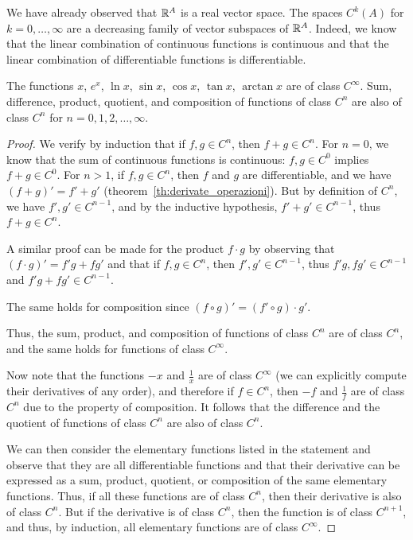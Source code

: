 We have already observed that ${\mathbb R}^A$ is a real vector space.
The spaces $C^k(A)$ for $k=0, \dots, \infty$ are a decreasing family of vector
subspaces of ${\mathbb R}^A$.
Indeed, we know that the linear combination of continuous functions is
continuous and that the linear combination of differentiable functions is
differentiable.

\begin{theorem}
The functions $x$, $e^x$, $\ln x$, $\sin x$, $\cos x$, $\tan x$, $\arctan x$ are
of class $C^\infty$.
Sum, difference, product, quotient, and composition of functions of class $C^n$
are also of class $C^n$ for $n=0,1,2,\dots,\infty$.
\end{theorem}
\begin{proof}
We verify by induction that if $f,g \in C^n$, then $f+g \in C^n$.
For $n=0$, we know that the sum of continuous functions is continuous: $f,g\in
C^0$ implies $f+g\in C^0$.
For $n>1$, if $f,g\in C^n$, then $f$ and $g$ are differentiable, and we have
$(f+g)'=f'+g'$ (theorem~\ref{th:derivate_operazioni}).
But by definition of $C^n$, we have $f',g'\in C^{n-1}$, and by the inductive
hypothesis, $f'+g'\in C^{n-1}$, thus $f+g\in C^n$.

A similar proof can be made for the product $f\cdot g$ by observing that
$(f\cdot g)' = f'g + fg'$ and that if $f,g\in C^n$, then $f',g'\in C^{n-1}$,
thus $f'g,fg'\in C^{n-1}$ and $f'g+fg'\in C^{n-1}$.

The same holds for composition since $(f\circ g)' = (f'\circ g)\cdot g'$.

Thus, the sum, product, and composition of functions of class $C^n$ are of class
$C^n$, and the same holds for functions of class $C^\infty$.

Now note that the functions $-x$ and $\frac 1 x$ are of class $C^\infty$ (we can
explicitly compute their derivatives of any order), and therefore if $f\in C^n$,
then $-f$ and $\frac 1 f$ are of class $C^n$ due to the property of composition.
It follows that the difference and the quotient of functions of class $C^n$ are
also of class $C^n$.

We can then consider the elementary functions listed in the statement and
observe that they are all differentiable functions and that their derivative can
be expressed as a sum, product, quotient, or composition of the same elementary
functions.
Thus, if all these functions are of class $C^n$, then their derivative is also
of class $C^n$.
But if the derivative is of class $C^n$, then the function is of class
$C^{n+1}$, and thus, by induction, all elementary functions are of class
$C^\infty$.
\end{proof}

